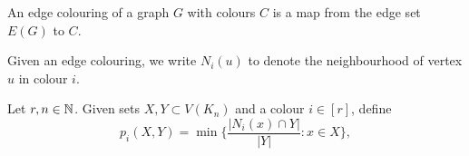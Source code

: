 \begin{definition}
  \label{def:complete-graph}
  \leanok
\end{definition}


\begin{definition}
  \label{def:edge-colouring}
  \leanok
  An edge colouring of a graph $G$ with colours $C$ is a map from the edge set $E(G)$ to $C$.
\end{definition}


\begin{definition}
  \label{def:colour-neighborhood}
  \leanok
  Given an edge colouring, we write $N_i(u)$ to denote the neighbourhood of vertex $u$ in colour $i$.
\end{definition}


\begin{definition}[Function \(p_i(X,Y)\)]
  \label{def:p}
  Let $r, n\in\mathbb{N}$. Given sets $X,Y \subset V(K_n)$ and a colour $i \in [r]$, define
  $$p_i(X,Y) = \min\bigg\{ \frac{|N_i(x) \cap Y|}{|Y|} : x \in X \bigg\},$$
\end{definition}

